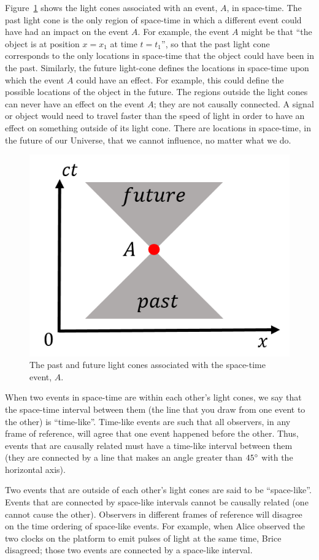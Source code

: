 Figure~\ref{fig:specialrelativity:cones} shows the light cones associated with an event, $A$, in space-time. The past light cone is the only region of space-time in which a different event could have had an impact on the event $A$. For example, the event $A$ might be that ``the object is at position $x=x_1$ at time $t=t_1$'', so that the past light cone corresponds to the only locations in space-time that the object could have been in the past. Similarly, the future light-cone defines the locations in space-time upon which the event $A$ could have an effect. For example, this could define the possible locations of the object in the future. The regions outside the light cones can never have an effect on the event $A$; they are not causally connected. A signal or object would need to travel faster than the speed of light in order to have an effect on something outside of its light cone. There are locations in space-time, in the future of our Universe, that we cannot influence, no matter what we do.

\begin{figure}[!htbp]
\centering
\includegraphics[width=0.5\linewidth]{files/cones-c0bdfac7e214c550281ebd9da604b0f5.png}
\caption[]{The past and future light cones associated with the space-time event, $A$.}
\label{fig:specialrelativity:cones}
\end{figure}

When two events in space-time are within each other's light cones, we say that the space-time interval between them (the line that you draw from one event to the other) is ``time-like''. Time-like events are such that all observers, in any frame of reference, will agree that one event happened before the other. Thus, events that are causally related must have a time-like interval between them (they are connected by a line that makes an angle greater than $45 {\rm \degree}$ with the horizontal axis).

Two events that are outside of each other's light cones are said to be ``space-like''. Events that are connected by space-like intervals cannot be causally related (one cannot cause the other). Observers in different frames of reference will disagree on the time ordering of space-like events. For example, when Alice observed the two clocks on the platform to emit pulses of light at the same time, Brice disagreed; those two events are connected by a space-like interval.

